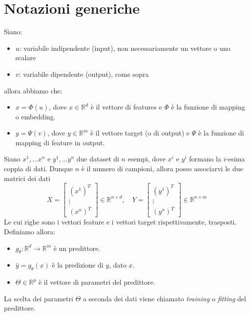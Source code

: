 \documentclass{../main.tex}[subfiles]
\begin{document}
\section{Notazioni generiche}
Siano:
\begin{itemize}
	\item $u$: variabile indipendente (input), non necessariamente un vettore o uno scalare
	\item $v$: variabile dipendente (output), come sopra 
\end{itemize}
allora abbiamo che:
\begin{itemize}
	\item $x=\Phi(u)$, dove $x\in \mathbb{R}^d$ è il vettore di features e $\Phi$ è la funzione di mapping o embedding.
	\item $y=\Psi(v)$, dove $y\in \mathbb{R}^m$ è il vettore target (o di output) e $\Psi$ è la funzione di mapping di feature in output.
\end{itemize}
Siano $x^1,\dots x^n$ e $y^1,\dots y^n$ due dataset di $n$ esempi, dove $x^i$ e $y^i$ formano la $i$-esima coppia di dati. Dunque $n$ è il numero di campioni, allora posso associarvi le due matrici dei dati
$$X=\begin{bmatrix}
	(x^1)^T\\ \vdots \\ (x^n)^T
\end{bmatrix}\in \mathbb{R}^{n \times d}, \quad Y=\begin{bmatrix}
	(y^1)^T\\ \vdots \\ (y^n)^T
\end{bmatrix}\in \mathbb{R}^{n \times m}$$
Le cui righe sono i vettori feature e i vettori target rispettivamente, trasposti.\\
Definiamo allora:
\begin{itemize}
	\item $g_\theta: \mathbb{R}^d \to \mathbb{R}^m$ è un predittore. 
	\item $\hat{y}=g_\theta(x)$ è la predizione di $y$, dato $x$.
	\item $\Theta\in\mathbb{R}^p$ è il vettore di parametri del predittore.
\end{itemize}
La scelta dei parametri $\Theta$ a seconda dei dati viene chiamato \textit{training} o \textit{fitting} del predittore. 
\end{document}
